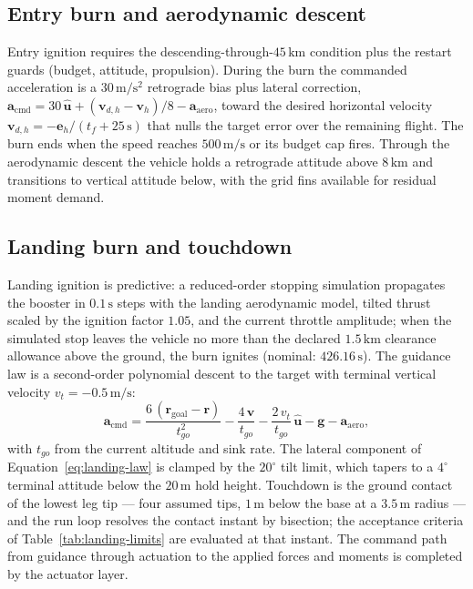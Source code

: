 \subsection{Entry burn and aerodynamic descent}

Entry ignition requires the descending-through-$45\,\mathrm{km}$
condition plus the restart guards (budget, attitude, propulsion). During
the burn the commanded acceleration is a $30\,\mathrm{m/s^2}$ retrograde
bias plus lateral correction,
$\mathbf{a}_{\mathrm{cmd}} = 30\,\hat{\mathbf{u}} +
(\mathbf{v}_{d,h} - \mathbf{v}_h)/8 - \mathbf{a}_{\mathrm{aero}}$, toward
the desired horizontal velocity
$\mathbf{v}_{d,h} = -\mathbf{e}_h/(t_f + 25\,\mathrm{s})$ that nulls the
target error over the remaining flight. The burn ends when the speed
reaches $500\,\mathrm{m/s}$ or its budget cap fires. Through the
aerodynamic descent the vehicle holds a retrograde attitude above
$8\,\mathrm{km}$ and transitions to vertical attitude below, with the
grid fins available for residual moment demand.

\subsection{Landing burn and touchdown}

Landing ignition is predictive: a reduced-order stopping simulation
propagates the booster in $0.1\,\mathrm{s}$ steps with the landing
aerodynamic model, tilted thrust scaled by the ignition factor $1.05$,
and the current throttle amplitude; when the simulated stop leaves the
vehicle no more than the declared $1.5\,\mathrm{km}$ clearance allowance
above the ground, the burn ignites (nominal: $426.16\,\mathrm{s}$). The
guidance law is a second-order polynomial descent to the target with
terminal vertical velocity $v_{t} = -0.5\,\mathrm{m/s}$:
%
\begin{equation}
\label{eq:landing-law}
\mathbf{a}_{\mathrm{cmd}} = \frac{6\,(\mathbf{r}_{\mathrm{goal}} -
\mathbf{r})}{t_{go}^2} - \frac{4\,\mathbf{v}}{t_{go}}
- \frac{2\,v_t}{t_{go}}\,\hat{\mathbf{u}}
- \mathbf{g} - \mathbf{a}_{\mathrm{aero}},
\end{equation}
%
with $t_{go}$ from the current altitude and sink rate. The lateral
component of Equation~\eqref{eq:landing-law} is clamped by the
$20^{\circ}$ tilt limit, which tapers to a $4^{\circ}$ terminal attitude
below the $20\,\mathrm{m}$ hold height. Touchdown is the ground contact
of the lowest leg tip --- four assumed tips, $1\,\mathrm{m}$ below the
base at a $3.5\,\mathrm{m}$ radius --- and the run loop resolves the
contact instant by bisection; the acceptance criteria of
Table~\ref{tab:landing-limits} are evaluated at that instant. The
command path from guidance through actuation to the applied forces and
moments is completed by the actuator layer.

